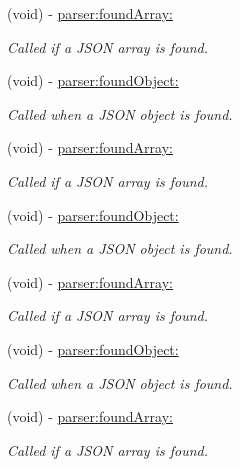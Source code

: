 \begin{DoxyCompactItemize}
(void) -\/ \hyperlink{protocol_s_b_json_stream_parser_adapter_delegate-p_acac3b4b2e4cfb45a8ca8ca945a47e326}{parser\-:found\-Array\-:}
\begin{DoxyCompactList}\small\item\em \-Called if a \-J\-S\-O\-N array is found. \end{DoxyCompactList}\item 
(void) -\/ \hyperlink{protocol_s_b_json_stream_parser_adapter_delegate-p_abefd538a1ce6d75eb3e8572a1049f597}{parser\-:found\-Object\-:}
\begin{DoxyCompactList}\small\item\em \-Called when a \-J\-S\-O\-N object is found. \end{DoxyCompactList}\item 
(void) -\/ \hyperlink{protocol_s_b_json_stream_parser_adapter_delegate-p_acac3b4b2e4cfb45a8ca8ca945a47e326}{parser\-:found\-Array\-:}
\begin{DoxyCompactList}\small\item\em \-Called if a \-J\-S\-O\-N array is found. \end{DoxyCompactList}\item 
(void) -\/ \hyperlink{protocol_s_b_json_stream_parser_adapter_delegate-p_abefd538a1ce6d75eb3e8572a1049f597}{parser\-:found\-Object\-:}
\begin{DoxyCompactList}\small\item\em \-Called when a \-J\-S\-O\-N object is found. \end{DoxyCompactList}\item 
(void) -\/ \hyperlink{protocol_s_b_json_stream_parser_adapter_delegate-p_acac3b4b2e4cfb45a8ca8ca945a47e326}{parser\-:found\-Array\-:}
\begin{DoxyCompactList}\small\item\em \-Called if a \-J\-S\-O\-N array is found. \end{DoxyCompactList}\item 
(void) -\/ \hyperlink{protocol_s_b_json_stream_parser_adapter_delegate-p_abefd538a1ce6d75eb3e8572a1049f597}{parser\-:found\-Object\-:}
\begin{DoxyCompactList}\small\item\em \-Called when a \-J\-S\-O\-N object is found. \end{DoxyCompactList}\item 
(void) -\/ \hyperlink{protocol_s_b_json_stream_parser_adapter_delegate-p_acac3b4b2e4cfb45a8ca8ca945a47e326}{parser\-:found\-Array\-:}
\begin{DoxyCompactList}\small\item\em \-Called if a \-J\-S\-O\-N array is found. \end{DoxyCompactList}\item 

\end{DoxyCompactItemize}
